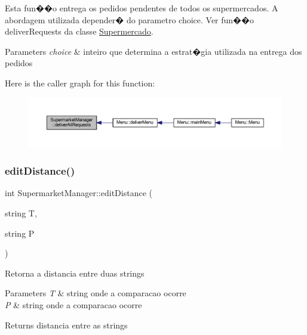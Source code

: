 Esta fun��o entrega os pedidos pendentes de todos os supermercados. A abordagem utilizada depender� do parametro \textquotesingle{}choice\textquotesingle{}. Ver fun��o \textquotesingle{}deliver\+Requests\textquotesingle{} da classe \hyperlink{class_supermercado}{Supermercado}.


\begin{DoxyParams}{Parameters}
{\em choice} & inteiro que determina a estrat�gia utilizada na entrega dos pedidos \\
\hline
\end{DoxyParams}
Here is the caller graph for this function\+:
\nopagebreak
\begin{figure}[H]
\begin{center}
\leavevmode
\includegraphics[width=350pt]{class_supermarket_manager_a034d77cc6da77516f6dbb4d6c3c0513d_icgraph}
\end{center}
\end{figure}
\mbox{\label{class_supermarket_manager_a16c8f9e3da09e91cb50d0ae932bb4eb2}} 
\subsubsection{\texorpdfstring{edit\+Distance()}{editDistance()}}
{\footnotesize\ttfamily int Supermarket\+Manager\+::edit\+Distance (\begin{DoxyParamCaption}\item[{string}]{T,  }\item[{string}]{P }\end{DoxyParamCaption})}

Retorna a distancia entre duas strings 
\begin{DoxyParams}{Parameters}
{\em T} & string onde a comparacao ocorre \\
\hline
{\em P} & string onde a comparacao ocorre \\
\hline
\end{DoxyParams}
\begin{DoxyReturn}{Returns}
distancia entre as strings 
\end{DoxyReturn}
\mbox{\label{class_supermarket_manager_addbb66cfbe7d097687595c38e16b9c62}} 
